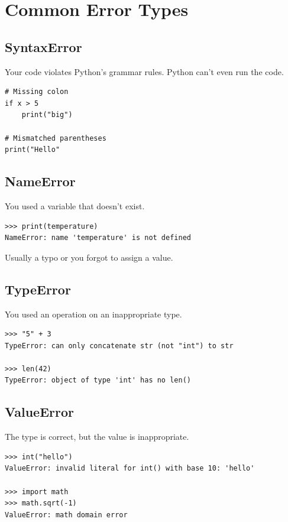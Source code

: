 \section{Common Error Types}
\label{sec:error-types}

\subsection{SyntaxError}

Your code violates Python's grammar rules. Python can't even run the code.

\begin{lstlisting}
# Missing colon
if x > 5
    print("big")

# Mismatched parentheses
print("Hello"
\end{lstlisting}

\subsection{NameError}

You used a variable that doesn't exist.

\begin{lstlisting}
>>> print(temperature)
NameError: name 'temperature' is not defined
\end{lstlisting}

Usually a typo or you forgot to assign a value.

\subsection{TypeError}

You used an operation on an inappropriate type.

\begin{lstlisting}
>>> "5" + 3
TypeError: can only concatenate str (not "int") to str

>>> len(42)
TypeError: object of type 'int' has no len()
\end{lstlisting}

\subsection{ValueError}

The type is correct, but the value is inappropriate.

\begin{lstlisting}
>>> int("hello")
ValueError: invalid literal for int() with base 10: 'hello'

>>> import math
>>> math.sqrt(-1)
ValueError: math domain error
\end{lstlisting}

